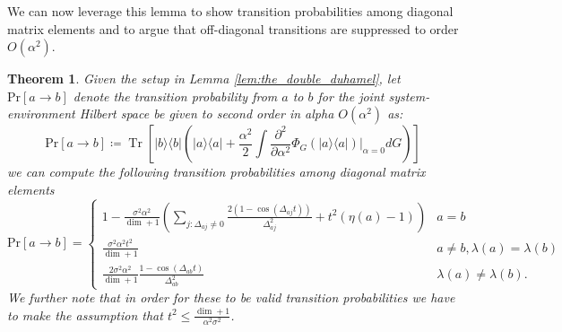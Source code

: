 \documentclass{article}
\newtheorem{theorem}{Theorem}
\newcommand{\ketbra}[2]{| #1\rangle\! \langle #2|}
\newcommand{\parens}[1]{\left( #1 \right)}
\newcommand{\brackets}[1]{\left[ #1 \right]}
\newcommand{\prob}[1]{\text{Pr}\left[ #1 \right]}
\newcommand{\bigo}[1]{O\left( #1 \right)}
\DeclareMathOperator{\Tr}{Tr}
\newcommand{\trace}[1]{\Tr \brackets{ #1 }}
\begin{document}
We can now leverage this lemma to show transition probabilities among diagonal matrix elements and to argue that off-diagonal transitions are suppressed to order $\bigo{\alpha^2}$.
\begin{theorem}
    Given the setup in Lemma \ref{lem:the_double_duhamel}, let $\prob{a \to b}$ denote the transition probability from $a$ to $b$ for the joint system-environment Hilbert space be given to second order in alpha $\bigo{\alpha^2}$ as:
    \begin{equation}
    \prob{a \to b} \coloneqq \trace{\ketbra{b}{b} \parens{\ketbra{a}{a} + \frac{\alpha^2}{2} \int \frac{\partial^2}{\partial \alpha^2} \Phi_G(\ketbra{a}{a}) \bigg|_{\alpha = 0} dG}}
    \end{equation}
    we can compute the following transition probabilities among diagonal matrix elements
    \begin{equation}
        \prob{a \to b} = \begin{cases}
            1 -\frac{ \sigma^2 \alpha^2}{\dim + 1} \parens{\sum_{j: \Delta_{aj} \neq 0} \frac{2( 1- \cos (\Delta_{aj}t)) }{\Delta_{aj}^2} + t^2 (\eta(a) - 1)} & a = b \\
            \frac{\sigma^2 \alpha^2 t^2}{\dim + 1} & a \neq b, \lambda(a) = \lambda(b) \\
            \frac{2\sigma^2 \alpha^2}{\dim + 1} \frac{1 - \cos( \Delta_{ab} t)}{\Delta_{ab}^2} & \lambda(a) \neq \lambda(b). \label{eq:transition_rule}
        \end{cases}
    \end{equation}
    We further note that in order for these to be valid transition probabilities we have to make the assumption that $t^2 \leq \frac{\dim + 1}{\alpha^2 \sigma^2}$. 
\end{theorem}
\end{document}
